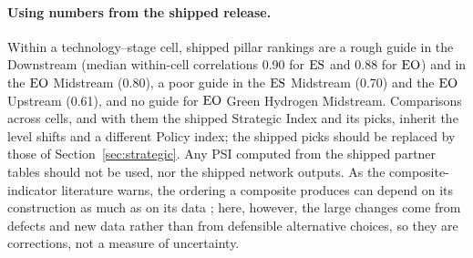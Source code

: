 \paragraph{Using numbers from the shipped release.} Within a technology--stage cell, shipped pillar
rankings are a rough guide in the Downstream (median within-cell correlations 0.90 for $\mathrm{ES}$ and 0.88
for $\mathrm{EO}$) and in the $\mathrm{EO}$ Midstream (0.80), a poor guide in the $\mathrm{ES}$ Midstream (0.70) and the $\mathrm{EO}$
Upstream (0.61), and no guide for $\mathrm{EO}$ Green Hydrogen Midstream. Comparisons across cells, and with
them the shipped Strategic Index and its picks, inherit the level shifts and a different Policy index;
the shipped picks should be replaced by those of Section~\ref{sec:strategic}. Any PSI computed
from the shipped partner tables should not be used, nor the shipped network outputs. As the
composite-indicator literature warns, the ordering a composite produces can depend on its
construction as much as on its data \citep{saisana2005uncertainty,saltelli2007composite}; here,
however, the large changes come from defects and new data rather than from defensible alternative
choices, so they are corrections, not a measure of uncertainty.
